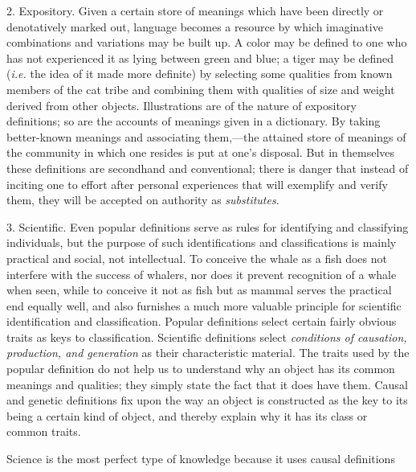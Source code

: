 \documentclass[letterpaper]{book}
\begin{document}

2. Expository. Given a certain store of meanings which have been
directly or denotatively marked out, language becomes a resource by
which imaginative combinations and variations may be built up. A color
may be defined to one who has not experienced it as lying between green
and blue; a tiger may be defined (\emph{i.e.} the idea of it made more
definite) by selecting some qualities from known members of the cat
tribe and combining them with qualities of size and weight derived from
other objects. Illustrations are of the nature of expository
definitions; so are the accounts of meanings given in a dictionary. By
taking better-known meanings and associating them,---the attained store
of meanings of the community in which one resides is put at one's
disposal. But in themselves these definitions are secondhand and
conventional; there is danger that instead of inciting one to effort
after personal experiences
that
will exemplify and verify them, they will be accepted on authority as
\emph{substitutes}.


3. Scientific. Even popular definitions serve as rules for identifying
and classifying individuals, but the purpose of such identifications and
classifications is mainly practical and social, not intellectual. To
conceive the whale as a fish does not interfere with the success of
whalers, nor does it prevent recognition of a whale when seen, while to
conceive it not as fish but as mammal serves the practical end equally
well, and also furnishes a much more valuable principle for scientific
identification and classification. Popular definitions select certain
fairly obvious traits as keys to classification. Scientific definitions
select \emph{conditions of causation, production, and generation} as
their characteristic material. The traits used by the popular definition
do not help us to understand why an object has its common meanings and
qualities; they simply state the fact that it does have them. Causal and
genetic definitions fix upon the way an object is constructed as the key
to its being a certain kind of object, and thereby explain why it has
its class or common traits.


Science is the most perfect type of knowledge because it uses causal
definitions
\end{document}
